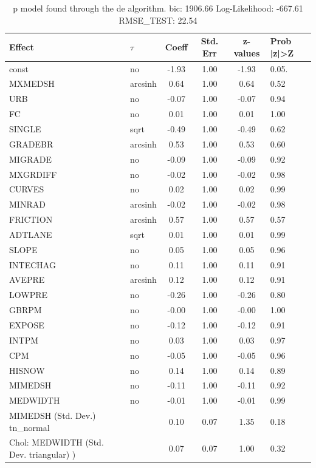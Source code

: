 \begin{table}
	\caption{p model found through the de algorithm. bic: 1906.66 Log-Likelihood: -667.61 RMSE_TEST: 22.54}
	\begin{center}
		\begin{tabular}{|l|l|c|c|c|l|}
			\hline
			Effect & $\tau$ & Coeff & Std. Err & z-values & Prob |z|>Z \\
			\hline
			const & no & -1.93 & 1.00 & -1.93 & 0.05. \\
			\hline
			MXMEDSH & arcsinh & 0.64 & 1.00 & 0.64 & 0.52 \\
			\hline
			URB & no & -0.07 & 1.00 & -0.07 & 0.94 \\
			\hline
			FC & no & 0.01 & 1.00 & 0.01 & 1.00 \\
			\hline
			SINGLE & sqrt & -0.49 & 1.00 & -0.49 & 0.62 \\
			\hline
			GRADEBR & arcsinh & 0.53 & 1.00 & 0.53 & 0.60 \\
			\hline
			MIGRADE & no & -0.09 & 1.00 & -0.09 & 0.92 \\
			\hline
			MXGRDIFF & no & -0.02 & 1.00 & -0.02 & 0.98 \\
			\hline
			CURVES & no & 0.02 & 1.00 & 0.02 & 0.99 \\
			\hline
			MINRAD & arcsinh & -0.02 & 1.00 & -0.02 & 0.98 \\
			\hline
			FRICTION & arcsinh & 0.57 & 1.00 & 0.57 & 0.57 \\
			\hline
			ADTLANE & sqrt & 0.01 & 1.00 & 0.01 & 0.99 \\
			\hline
			SLOPE & no & 0.05 & 1.00 & 0.05 & 0.96 \\
			\hline
			INTECHAG & no & 0.11 & 1.00 & 0.11 & 0.91 \\
			\hline
			AVEPRE & arcsinh & 0.12 & 1.00 & 0.12 & 0.91 \\
			\hline
			LOWPRE & no & -0.26 & 1.00 & -0.26 & 0.80 \\
			\hline
			GBRPM & no & -0.00 & 1.00 & -0.00 & 1.00 \\
			\hline
			EXPOSE & no & -0.12 & 1.00 & -0.12 & 0.91 \\
			\hline
			INTPM & no & 0.03 & 1.00 & 0.03 & 0.97 \\
			\hline
			CPM & no & -0.05 & 1.00 & -0.05 & 0.96 \\
			\hline
			HISNOW & no & 0.14 & 1.00 & 0.14 & 0.89 \\
			\hline
			MIMEDSH & no & -0.11 & 1.00 & -0.11 & 0.92 \\
			\hline
			MEDWIDTH & no & -0.01 & 1.00 & -0.01 & 0.99 \\
			\hline
			MIMEDSH (Std. Dev.) tn_normal &  & 0.10 & 0.07 & 1.35 & 0.18 \\
			\hline
			 Chol: MEDWIDTH (Std. Dev. triangular) ) &  & 0.07 & 0.07 & 1.00 & 0.32 \\
			\hline
		\end{tabular}
	\end{center}
\end{table}